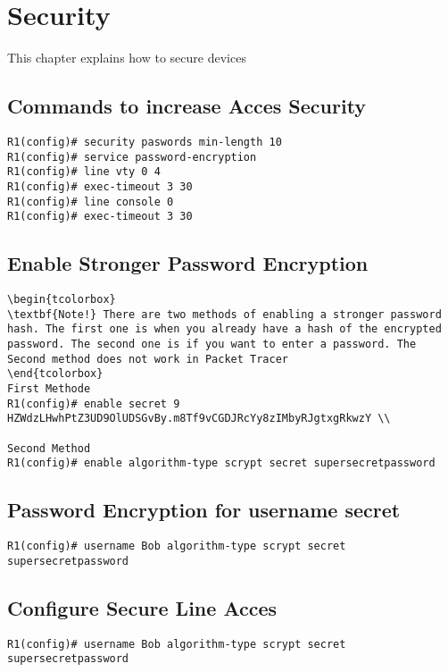 \section{Security}
This chapter explains how to secure devices 
\subsection{Commands to increase Acces Security}
\begin{verbatim}
R1(config)# security paswords min-length 10 
R1(config)# service password-encryption
R1(config)# line vty 0 4 
R1(config)# exec-timeout 3 30
R1(config)# line console 0 
R1(config)# exec-timeout 3 30
\end{verbatim}

\subsection{Enable Stronger Password Encryption}
\begin{verbatim}
\begin{tcolorbox}
\textbf{Note!} There are two methods of enabling a stronger password hash. The first one is when you already have a hash of the encrypted password. The second one is if you want to enter a password. The Second method does not work in Packet Tracer
\end{tcolorbox}
First Methode
R1(config)# enable secret 9 HZWdzLHwhPtZ3UD9OlUDSGvBy.m8Tf9vCGDJRcYy8zIMbyRJgtxgRkwzY \\

Second Method
R1(config)# enable algorithm-type scrypt secret supersecretpassword 
\end{verbatim}

\subsection{Password Encryption for username secret}
\begin{verbatim}
R1(config)# username Bob algorithm-type scrypt secret supersecretpassword 
\end{verbatim}


\subsection{Configure Secure Line Acces}
\begin{verbatim}
R1(config)# username Bob algorithm-type scrypt secret supersecretpassword 
\end{verbatim}


